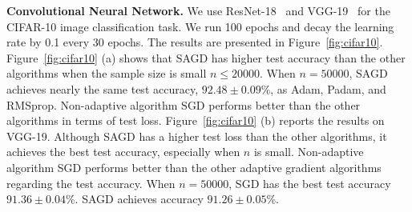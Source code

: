 \documentclass[11pt]{article}
\begin{document}
\vspace{-0.05in}
\textbf{Convolutional Neural Network.}
We use ResNet-18~\citep{hezh2016} and VGG-19~\citep{sizi2014} for the CIFAR-10 image classification task. We run 100 epochs and decay the learning rate by 0.1 every 30 epochs. 
The results are presented in Figure~\ref{fig:cifar10}. Figure~\ref{fig:cifar10} (a) shows that \textsc{SAGD} has higher test accuracy than the 
other algorithms when the sample size is small \ie $n \leq 20000$.
When $n = 50000$, \textsc{SAGD} achieves nearly the same test accuracy, $92.48 \pm 0.09\%$,  as Adam, Padam, and RMSprop.
Non-adaptive algorithm 
SGD performs better than the other algorithms in terms of test loss. 
Figure~\ref{fig:cifar10} (b) reports the results on VGG-19. Although \textsc{SAGD} has a higher test loss than the other algorithms, it achieves the best test accuracy, especially when $n$ is small. Non-adaptive algorithm SGD performs better than the other adaptive gradient algorithms regarding the test accuracy.
When $n= 50000$, SGD has the best test accuracy $91.36 \pm 0.04\%$. \textsc{SAGD} achieves accuracy $91.26 \pm 0.05\%$.
\vspace{-0.3in}
\end{document}
